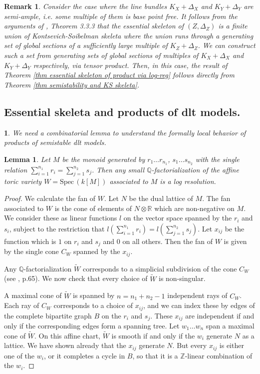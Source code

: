 \documentclass{amsart}%
\numberwithin{equation}{subsection}
\theoremstyle{plain2}
\newtheorem{lemma}[equation]{Lemma}
\theoremstyle{definition2}
\newtheorem{rem}[equation]{Remark}
\theoremstyle{stepstyle}
\theoremstyle{point}
\theoremstyle{subpoint}
\newtheorem{subpoint}[equation]{}%
\newcommand{\spa}[1]{\begin{subpoint}#1\end{subpoint}}           %
\newcommand{\Spec}{\ensuremath{\mathrm{Spec}\,}}
\begin{document}
\begin{rem}
Consider the case where the line bundles $K_X + \Delta_X$ and $K_Y + \Delta_Y$ are semi-ample, i.e. some multiple of them is base point free. It follows from the arguments of \cite{NicaiseXu}, Theorem 3.3.3 that the essential skeleton of $(Z,\Delta_Z)$ is a finite union of Kontsevich-Soibelman skeleta where the union runs through a generating set of global sections of a sufficiently large multiple of $K_Z+\Delta_Z$. We can construct such a set from generating sets of global sections of multiples of $K_X + \Delta_X$ and $K_Y+ \Delta_Y$ respectively, via tensor product. Then, in this case, the result of Theorem \ref{thm essential skeleton of product via log-reg} follows directly from Theorem \ref{thm semistability and KS skeleta}.
\end{rem}


\subsection{Essential skeleta and products of dlt models.} 
\spa{We need a combinatorial lemma to understand the formally local behavior of products of semistable dlt models.}
\begin{lemma}\label{smalltoric}
Let $M$ be the monoid generated by $r_1 \ldots r_{n_1}$, $s_1 \ldots s_{n_2}$ with the single relation $\sum_{i=1}^{n_1} r_i = \sum_{j=1}^{n_2} s_j$. Then any small $\mathbb{Q}$-factorialization of the affine toric variety $W=\Spec(k[M])$ associated to $M$ is a log resolution.
\end{lemma}

\begin{proof}
We calculate the fan of $W$. Let $N$ be the dual lattice of $M$. The fan associated to $W$ is the cone of elements of $N\otimes \mathbb{R}$ which are non-negative on $M$. We consider these as linear functions $l$ on the vector space spanned by the $r_i$ and $s_i$, subject to the restriction that $l(\sum_{i=1}^{n_1} r_i)=l( \sum_{j=1}^{n_2} s_j)$. Let $x_{ij}$ be the function which is $1$ on $r_i$ and $s_j$ and $0$ on all others. Then the fan of $W$ is given by the single cone $C_W$ spanned by the $x_{ij}$.

Any $\mathbb{Q}$-factorialization $\widetilde{W}$ corresponds to a simplicial subdivision of the cone $C_W$ (see \cite{Fulton1993}, p.65). We now check that every choice of $\widetilde{W}$ is non-singular.

A maximal cone of $\widetilde{W}$ is spanned by $n=n_1+n_2-1$ independent rays of $C_W$. Each ray of $C_W$ corresponds to a choice of $x_{ij}$, and we can index these by edges of the complete bipartite graph $B$ on the $r_i$ and $s_j$. These $x_{ij}$ are independent if and only if the corresponding edges form a spanning tree. Let $w_1 \ldots w_{n}$ span a maximal cone of $\widetilde{W}$. On this affine chart, $\widetilde{W}$ is smooth if and only if the $w_i$ generate $N$ as a lattice. We have shown already that the $x_{ij}$ generate $N$. But every $x_{ij}$ is either one of the $w_i$, or it completes a cycle in $B$, so that it is a $\mathbb{Z}$-linear combination of the $w_i$.
\end{proof}
\end{document}
